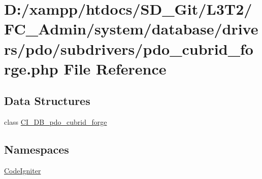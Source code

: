 \hypertarget{_admin_2system_2database_2drivers_2pdo_2subdrivers_2pdo__cubrid__forge_8php}{}\section{D\+:/xampp/htdocs/\+S\+D\+\_\+\+Git/\+L3\+T2/\+F\+C\+\_\+\+Admin/system/database/drivers/pdo/subdrivers/pdo\+\_\+cubrid\+\_\+forge.php File Reference}
\label{_admin_2system_2database_2drivers_2pdo_2subdrivers_2pdo__cubrid__forge_8php}
\subsection*{Data Structures}
\begin{DoxyCompactItemize}
\item 
class \hyperlink{class_c_i___d_b__pdo__cubrid__forge}{C\+I\+\_\+\+D\+B\+\_\+pdo\+\_\+cubrid\+\_\+forge}
\end{DoxyCompactItemize}
\subsection*{Namespaces}
\begin{DoxyCompactItemize}
\item 
 \hyperlink{namespace_code_igniter}{Code\+Igniter}
\end{DoxyCompactItemize}
